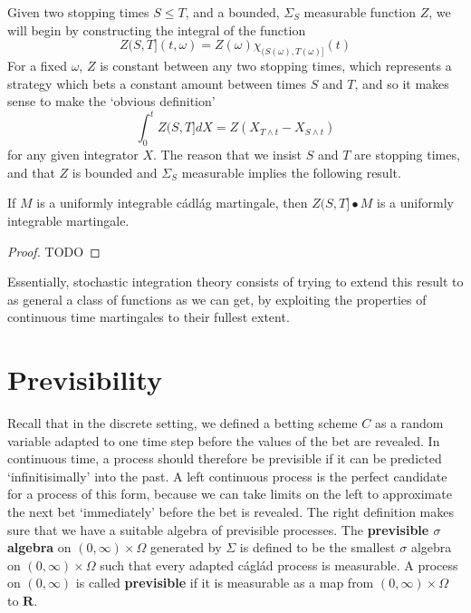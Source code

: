 Given two stopping times $S \leq T$, and a bounded, $\Sigma_S$ measurable function $Z$, we will begin by constructing the integral of the function
%
\[ Z(S,T](t,\omega) = Z(\omega) \chi_{(S(\omega),T(\omega)]}(t) \]
%
For a fixed $\omega$, $Z$ is constant between any two stopping times, which represents a strategy which bets a constant amount between times $S$ and $T$, and so it makes sense to make the `obvious definition'
%
\[ \int_0^t Z(S,T] dX = Z(X_{T \wedge t} - X_{S \wedge t}) \]
%
for any given integrator $X$. The reason that we insist $S$ and $T$ are stopping times, and that $Z$ is bounded and $\Sigma_S$ measurable implies the following result.

\begin{lemma}
    If $M$ is a uniformly integrable c\'{a}dl\'{a}g martingale, then $Z(S,T] \bullet M$ is a uniformly integrable martingale.
\end{lemma}
\begin{proof}
    TODO
\end{proof}

Essentially, stochastic integration theory consists of trying to extend this result to as general a class of functions as we can get, by exploiting the properties of continuous time martingales to their fullest extent.

\section{Previsibility}

Recall that in the discrete setting, we defined a betting scheme $C$ as a random variable adapted to one time step before the values of the bet are revealed. In continuous time, a process should therefore be previsible if it can be predicted `infinitisimally' into the past. A left continuous process is the perfect candidate for a process of this form, because we can take limits on the left to approximate the next bet `immediately' before the bet is revealed. The right definition makes sure that we have a suitable algebra of previsible processes. The {\bf previsible $\sigma$ algebra} on $(0,\infty) \times \Omega$ generated by $\Sigma$ is defined to be the smallest $\sigma$ algebra on $(0,\infty) \times \Omega$ such that every adapted c\'{a}gl\'{a}d process is measurable. A process on $(0,\infty)$ is called {\bf previsible} if it is measurable as a map from $(0,\infty) \times \Omega$ to $\mathbf{R}$.

